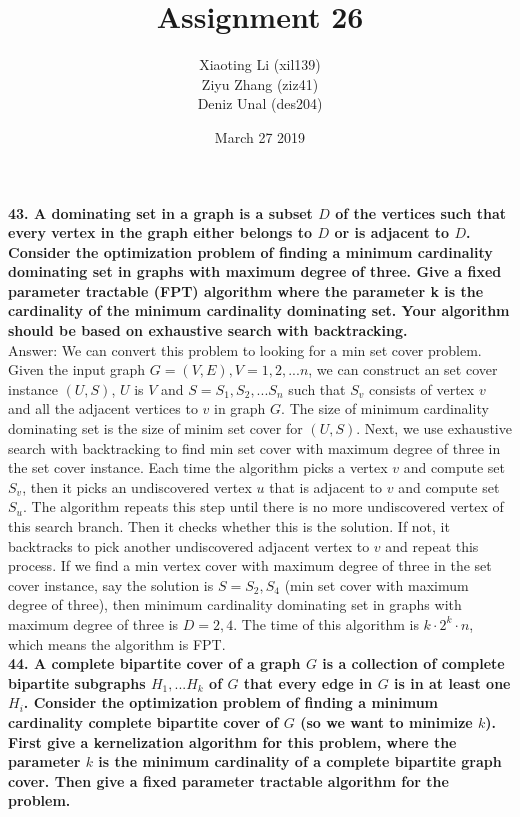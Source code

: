 \documentclass{article}
\title{Assignment 26}
\author{Xiaoting Li (xil139) \\
Ziyu Zhang (ziz41) \\
Deniz Unal (des204)}
\date{March 27 2019}
\begin{document}
\maketitle
\noindent
\textbf{43. A dominating set in a graph is a subset $D$ of the vertices such that every vertex in the graph either belongs to $D$ or is adjacent to $D$. Consider the optimization problem of finding a minimum cardinality dominating set in graphs with maximum degree of three. Give a fixed parameter tractable (FPT) algorithm where the parameter k is the cardinality of the minimum cardinality dominating set. Your algorithm should be based on exhaustive search with backtracking.} \\ \newline
Answer: We can convert this problem to looking for a min set cover problem. Given the input graph $G = (V, E), V = {1, 2, ... n}$, we can construct an set cover instance $(U, S)$, $U$ is $V$ and $S = {S_1, S_2, ... S_n}$ such that $S_v$ consists of vertex $v$ and all the adjacent vertices to $v$ in graph $G$. The size of minimum cardinality dominating set is the size of minim set cover for $(U, S)$. Next, we use exhaustive search with backtracking to find min set cover with maximum degree of three in the set cover instance. Each time the algorithm picks a vertex $v$ and compute set $S_v$, then it picks an undiscovered vertex $u$ that is adjacent to $v$ and compute set $S_u$. The algorithm repeats this step until there is no more undiscovered vertex of this search branch. Then it checks whether this is the solution. If not, it backtracks to pick another undiscovered adjacent vertex to $v$ and repeat this process. If we find a min vertex cover with maximum degree of three in the set cover instance, say the solution is $S = {S_2, S_4}$ (min set cover with maximum degree of three), then minimum cardinality dominating set in graphs with maximum degree of three is $D= {2, 4}$. The time of this algorithm is $k \cdot 2^k \cdot n$, which means the algorithm is FPT.\\ \newline
\textbf{44. A complete bipartite cover of a graph $G$ is a collection of complete bipartite subgraphs $H_1, ... H_k$ of $G$ that every edge in $G$ is in at least one $H_i$. Consider the optimization problem of finding a minimum cardinality complete bipartite cover of $G$ (so we want to minimize $k$). First give a kernelization algorithm for this problem, where the parameter $k$ is the minimum cardinality of a complete bipartite graph cover. Then give a fixed parameter tractable algorithm for the problem.} \\ \newline
\end{document}
